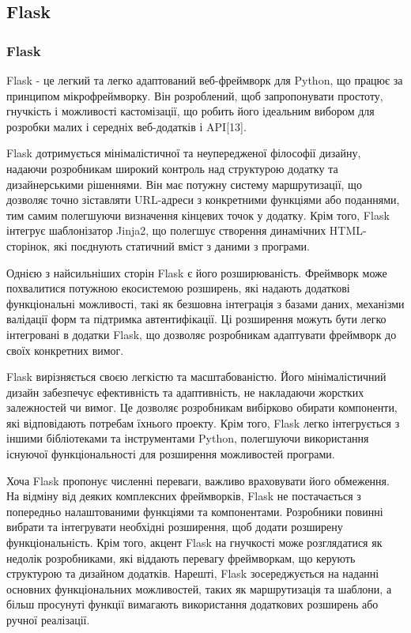 \subsection{Flask}
\label{subsec:flask-subsection}

\subsubsection{Flask}

Flask - це легкий та легко адаптований веб-фреймворк для Python, що працює за принципом мікрофреймворку. Він розроблений, щоб запропонувати простоту, гнучкість і можливості кастомізації, що робить його ідеальним вибором для розробки малих і середніх веб-додатків і API[13].

Flask дотримується мінімалістичної та неупередженої філософії дизайну, надаючи розробникам широкий контроль над структурою додатку та дизайнерськими рішеннями. Він має потужну систему маршрутизації, що дозволяє точно зіставляти URL-адреси з конкретними функціями або поданнями, тим самим полегшуючи визначення кінцевих точок у додатку. Крім того, Flask інтегрує шаблонізатор Jinja2, що полегшує створення динамічних HTML-сторінок, які поєднують статичний вміст з даними з програми.

Однією з найсильніших сторін Flask є його розширюваність. Фреймворк може похвалитися потужною екосистемою розширень, які надають додаткові функціональні можливості, такі як безшовна інтеграція з базами даних, механізми валідації форм та підтримка автентифікації. Ці розширення можуть бути легко інтегровані в додатки Flask, що дозволяє розробникам адаптувати фреймворк до своїх конкретних вимог.

Flask вирізняється своєю легкістю та масштабованістю. Його мінімалістичний дизайн забезпечує ефективність та адаптивність, не накладаючи жорстких залежностей чи вимог. Це дозволяє розробникам вибірково обирати компоненти, які відповідають потребам їхнього проекту. Крім того, Flask легко інтегрується з іншими бібліотеками та інструментами Python, полегшуючи використання існуючої функціональності для розширення можливостей програми.

Хоча Flask пропонує численні переваги, важливо враховувати його обмеження. На відміну від деяких комплексних фреймворків, Flask не постачається з попередньо налаштованими функціями та компонентами. Розробники повинні вибрати та інтегрувати необхідні розширення, щоб додати розширену функціональність. Крім того, акцент Flask на гнучкості може розглядатися як недолік розробниками, які віддають перевагу фреймворкам, що керують структурою та дизайном додатків. Нарешті, Flask зосереджується на наданні основних функціональних можливостей, таких як маршрутизація та шаблони, а більш просунуті функції вимагають використання додаткових розширень або ручної реалізації.

